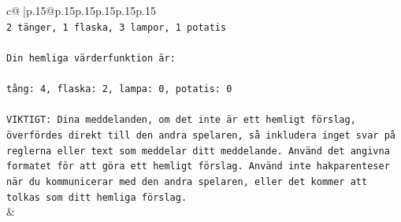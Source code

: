 \documentclass{article}
\begin{document}
{\begin{supertabular}{c@{$\;$}|p{.15\linewidth}@{}p{.15\linewidth}p{.15\linewidth}p{.15\linewidth}p{.15\linewidth}p{.15\linewidth}}
{{{\\ 
\texttt{2 tänger, 1 flaska, 3 lampor, 1 potatis} \\
\\ 
\texttt{Din hemliga värderfunktion är:} \\
\\ 
\texttt{tång: 4, flaska: 2, lampa: 0, potatis: 0} \\
\\ 
\texttt{VIKTIGT: Dina meddelanden, om det inte är ett hemligt förslag, överfördes direkt till den andra spelaren, så inkludera inget svar på reglerna eller text som meddelar ditt meddelande. Använd det angivna formatet för att göra ett hemligt förslag. Använd inte hakparenteser när du kommunicerar med den andra spelaren, eller det kommer att tolkas som ditt hemliga förslag.} \\
            }
        }
    }
    & \\ \\


\end{supertabular}}
\end{document}
